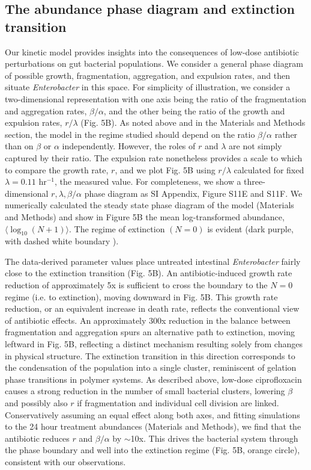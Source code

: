  \subsection{The abundance phase diagram and extinction transition}

Our kinetic model provides insights into the consequences of low-dose antibiotic perturbations on gut bacterial populations. We consider a general phase diagram of possible growth, fragmentation, aggregation, and expulsion rates, and then situate \textit{Enterobacter} in this space. For simplicity of illustration, we consider a two-dimensional representation with one axis being the ratio of the fragmentation and aggregation rates, $\beta/\alpha$, and the other being the ratio of the growth and expulsion rates, $r/\lambda$ (Fig. 5B). As noted above and in the Materials and Methods section, the model in the regime studied should depend on the ratio $\beta/\alpha$ rather than on $\beta$ or $\alpha$ independently. However, the roles of $r$ and $\lambda$ are not simply captured by their ratio. The expulsion rate nonetheless provides a scale to which to compare the growth rate, $r$, and we plot Fig. 5B using  $r/\lambda$  calculated for fixed $\lambda = 0.11$ hr$^{-1}$, the measured value. For completeness, we show a three-dimensional $r,  \lambda, \beta/\alpha$ phase diagram as SI Appendix, Figure S11E and S11F. We numerically calculated the steady state phase diagram of the model (Materials and Methods) and show in Figure 5B the mean log-transformed abundance, $\langle\log_{10}(N+1)\rangle$. The regime of extinction $(N=0)$ is evident (dark purple, with dashed white boundary ). 


The data-derived parameter values place untreated intestinal \textit{Enterobacter} fairly close to the extinction transition (Fig. 5B). An antibiotic-induced growth rate reduction of approximately 5x is sufficient to cross the boundary to the $N=0$ regime (i.e. to extinction), moving downward in Fig. 5B. This growth rate reduction, or an equivalent increase in death rate, reflects the conventional view of antibiotic effects.  An approximately 300x reduction in the balance between fragmentation and aggregation spurs an alternative path to extinction, moving leftward in Fig. 5B, reflecting a distinct mechanism resulting solely from changes in physical structure. The extinction transition in this direction corresponds to the condensation of the population into a single cluster, reminiscent of gelation phase transitions in polymer systems. As described above, low-dose ciprofloxacin causes a strong reduction in the number of small bacterial clusters, lowering $\beta$ and possibly also $r$ if fragmentation and individual cell division are linked. Conservatively assuming an equal effect along both axes, and fitting simulations to the 24 hour treatment abundances (Materials and Methods), we find that the antibiotic reduces $r$ and $\beta/\alpha$ by $\sim$10x. This drives the bacterial system through the phase boundary and well into the extinction regime (Fig. 5B, orange circle), consistent with our observations. 

